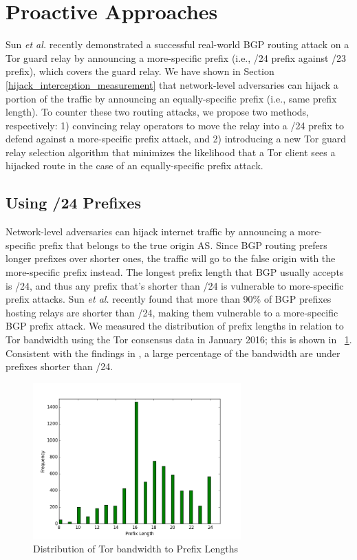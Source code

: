 \section{Proactive Approaches}
\label{sec:proactive}
Sun \emph{et al.} \cite{sun2015raptor} recently demonstrated a successful real-world BGP routing attack on a Tor guard relay by announcing a more-specific prefix (i.e., /24 prefix against /23 prefix), which covers the guard relay. We have shown in Section \ref{hijack_interception_measurement} that network-level adversaries can hijack a portion of the traffic by announcing an equally-specific prefix (i.e., same prefix length). To counter these two routing attacks, we propose two methods, respectively: 1) convincing relay operators to move the relay into a /24 prefix to defend against a more-specific prefix attack, and 2) introducing a new Tor guard relay selection algorithm that minimizes the likelihood that a Tor client sees a hijacked route in the case of an equally-specific prefix attack.

\subsection{Using /24 Prefixes}
\label{subsec:24prefix}
Network-level adversaries can hijack internet traffic by announcing a more-specific prefix that belongs to the true origin AS. Since BGP routing prefers longer prefixes over shorter ones, the traffic will go to the false origin with the more-specific prefix instead. The longest prefix length that BGP usually accepts is /24, and thus any prefix that's shorter than /24 is vulnerable to more-specific prefix attacks. 
Sun \emph{et al.} \cite{sun2015raptor} recently found that more than 90\% of BGP prefixes hosting relays are
shorter than /24, making them vulnerable to a more-specific BGP prefix attack. We measured the distribution of prefix lengths in relation to Tor bandwidth using the Tor consensus data in January 2016; this is shown in ~\ref{fig_prefixlen}. Consistent with the findings in \cite{sun2015raptor}, a large percentage of the bandwidth are under prefixes shorter than /24. 

\begin{figure}[ht!]
\centering
\includegraphics[width=80mm]{prefix_len_graph}
\caption{Distribution of Tor bandwidth to Prefix Lengths  \label{fig_prefixlen}}
\end{figure}

